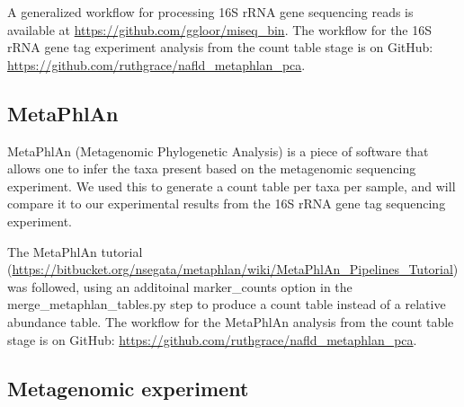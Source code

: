 A generalized workflow for processing 16S rRNA gene sequencing reads is available at \url{https://github.com/ggloor/miseq_bin}. The workflow for the 16S rRNA gene tag experiment analysis from the count table stage is on GitHub: \url{https://github.com/ruthgrace/nafld_metaphlan_pca}.

\subsection{MetaPhlAn}

MetaPhlAn (Metagenomic Phylogenetic Analysis) \cite{segata2012metagenomic} is a piece of software that allows one to infer the taxa present based on the metagenomic sequencing experiment. We used this to generate a count table per taxa per sample, and will compare it to our experimental results from the 16S rRNA gene tag sequencing experiment.

The MetaPhlAn tutorial (\url{https://bitbucket.org/nsegata/metaphlan/wiki/MetaPhlAn_Pipelines_Tutorial}) was followed, using an additoinal marker_counts option in the merge_metaphlan_tables.py step to produce a count table instead of a relative abundance table. The workflow for the MetaPhlAn analysis from the count table stage is on GitHub: \url{https://github.com/ruthgrace/nafld_metaphlan_pca}.

\subsection{Metagenomic experiment}

